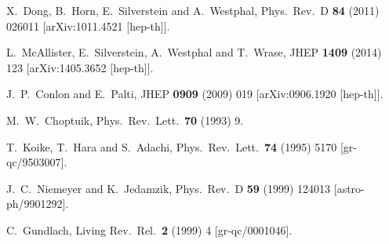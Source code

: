 \begin{thebibliography}{10}
  X.~Dong, B.~Horn, E.~Silverstein and A.~Westphal,
  Phys.\ Rev.\ D {\bf 84} (2011) 026011
  [arXiv:1011.4521 [hep-th]].


  L.~McAllister, E.~Silverstein, A.~Westphal and T.~Wrase,
  JHEP {\bf 1409} (2014) 123
  [arXiv:1405.3652 [hep-th]].


  J.~P.~Conlon and E.~Palti,
  JHEP {\bf 0909} (2009) 019
  [arXiv:0906.1920 [hep-th]].


  M.~W.~Choptuik,
  Phys.\ Rev.\ Lett.\  {\bf 70} (1993) 9.


  T.~Koike, T.~Hara and S.~Adachi,
  Phys.\ Rev.\ Lett.\  {\bf 74} (1995) 5170
  [gr-qc/9503007].


  J.~C.~Niemeyer and K.~Jedamzik,
  Phys.\ Rev.\ D {\bf 59} (1999) 124013
  [astro-ph/9901292].


  C.~Gundlach,
  Living Rev.\ Rel.\  {\bf 2} (1999) 4
  [gr-qc/0001046].



\end{thebibliography}
